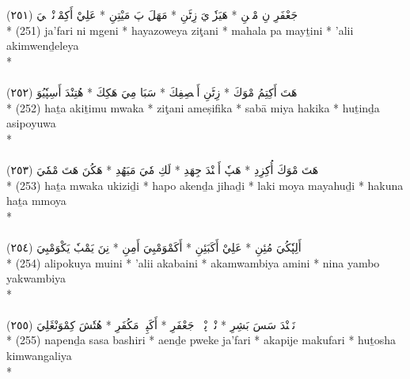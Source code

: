 \documentclass[a4paper, 12pt]{report}
\begin{document}
\begin{center}
\textarabic{(٢٥١) \textcolor{mygreen}{جَعْفَرِ نِ مْڠٖنِ  * هَيَزٗوٖيَ زِٹَنِ  * مَهَلَ پَ مَيْتِنِ  * عَلِيْ أَكِمْوٖنْدٖلٖيَ }} \\* 
(251) ja'fari ni mgeni  * hayazoweya ziţani  * mahala pa mayṯini  * 'alii akimwenḏeleya  \\* 
 \\ 
\\[8mm] 

\textarabic{(٢٥٢) \textcolor{mygreen}{هَتَ أَكِتِمُ مْوَكَ  * زِٹَنِ أَمٖصِفِكَ  * سَبَا مِيَ هَكِكَ  * هُتِنْدَ أَسِپٗيُوَ }} \\* 
(252) haṯa akiṯimu mwaka  * ziţani ameṣifika  * sabā miya hakika  * huṯinḏa asipoyuwa  \\* 
 \\ 
\\[8mm] 

\textarabic{(٢٥٣) \textcolor{mygreen}{هَتَ مْوَكَ أُكِزِدِ  * هَپٗ أَكٖنْدَ جِهَدِ  * لَكِ مٗيَ مَيَهُدِ  * هَكُنَ هَتَ مْمٗيَ }} \\* 
(253) haṯa mwaka ukiziḏi  * hapo akenḏa jihaḏi  * laki moya mayahuḏi  * hakuna haṯa mmoya  \\* 
 \\ 
\\[8mm] 

\textarabic{(٢٥٤) \textcolor{mygreen}{أَلِپٗكُيَ مُئِنِ  * عَلِيْ أَكَبَئِنِ  * أَكَمْوَمْبِيَ أَمِنِ  * نِنَ يَمْبٗ يَكْوَمْبِيَ }} \\* 
(254) alipokuya muini  * 'alii akabaini  * akamwambiya amini  * nina yambo yakwambiya  \\* 
 \\ 
\\[8mm] 

\textarabic{(٢٥٥) \textcolor{mygreen}{نَپٖنْدَ سَسَ بَشِرِ  * َٖنْدٖ پْوٖكٖ جَعْفَرِ  * أَكَپِجٖ مَكُفَرِ  * هُتٗشَ كِمْوَنْڠَلِيَ }} \\* 
(255) napenḏa sasa bashiri  * aenḏe pweke ja'fari  * akapije makufari  * huṯosha kimwangaliya  \\* 
 \\ 
\\[8mm] 


\end{center}
\end{document}
